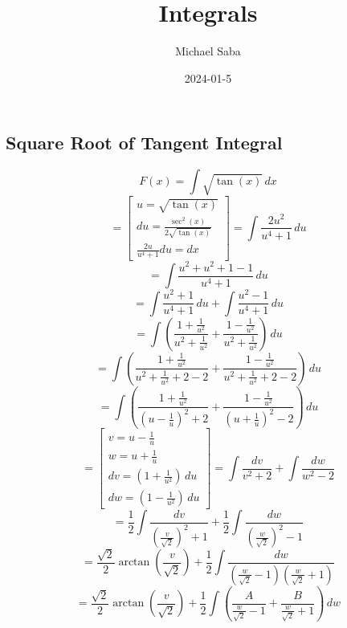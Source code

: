 \documentclass[12pt]{article}
\title{%
    \Huge Integrals \\
}
\date{2024-01-5}
\author{Michael Saba}
\begin{document}
    \maketitle
    \newpage

    \subsection*{Square Root of Tangent Integral}
    \[
        F(x) = \int \sqrt{\tan{(x)}} \, dx 
    \]
    \[
        = \begin{bmatrix}
            u = \sqrt{\tan{(x)}} \\
            du = \frac{\sec^2{(x)}}{2\sqrt{\tan{(x)}}} \\
            \frac{2u}{u^4 + 1}du = dx
        \end{bmatrix} = \int \frac{2u^2}{u^4 + 1} \, du 
    \]
    \[
        = \int \frac{u^2 + u^2 + 1 - 1}{u^4 + 1} \, du 
    \]
    \[
        = \int \frac{u^2 + 1}{u^4 + 1} \, du 
        + \int \frac{u^2 - 1}{u^4 + 1} \, du 
    \]
    \[
        = \int \left(\frac{1 + \frac{1}{u^2}}{u^2 
        + \frac{1}{u^2}} + \frac{1 - \frac{1}{u^2}}{u^2 
        + \frac{1}{u^2}}\right) \, du 
    \]
    \[
        = \int \left(\frac{1 + \frac{1}{u^2}}{u^2 
        + \frac{1}{u^2} + 2 - 2} + \frac{1 - \frac{1}{u^2}}
        {u^2 + \frac{1}{u^2} + 2 - 2}\right) \, du 
    \]
    \[
        = \int \left(\frac{1 + \frac{1}{u^2}}
        {(u - \frac{1}{u})^2 + 2} + \frac{1 - \frac{1}{u^2}}
        {(u + \frac{1}{u})^2 - 2}\right) \, du 
    \]
    \[
        = \begin{bmatrix}
            v = u - \frac{1}{u} \\
            w = u + \frac{1}{u} \\
            dv = (1 + \frac{1}{u^2}) \, du \\
            dw = (1 - \frac{1}{u^2}) \, du
        \end{bmatrix}
        = \int \frac{dv}{v^2 + 2} + \int \frac{dw}{w^2 - 2} 
    \]
    \[
        = \frac{1}{2}\int \frac{dv}{\left(\frac{v}{\sqrt{2}}\right)^2 + 1} 
        + \frac{1}{2}\int \frac{dw}{\left(\frac{w}{\sqrt{2}}\right)^2 - 1} 
    \]
    \[
        = \frac{\sqrt{2}}{2}\arctan{\left(\frac{v}{\sqrt{2}}\right)} 
        + \frac{1}{2}\int \frac{dw}{\left(\frac{w}{\sqrt{2}} - 1\right)
        \left(\frac{w}{\sqrt{2}} + 1\right)} 
    \]
    \[
        = \frac{\sqrt{2}}{2}\arctan{\left(\frac{v}{\sqrt{2}}\right)} 
        + \frac{1}{2}\int \left(\frac{A}{\frac{w}{\sqrt{2}} - 1} + \frac{B}
        {\frac{w}{\sqrt{2}} + 1}\right) \, dw 
    \]
\end{document}
